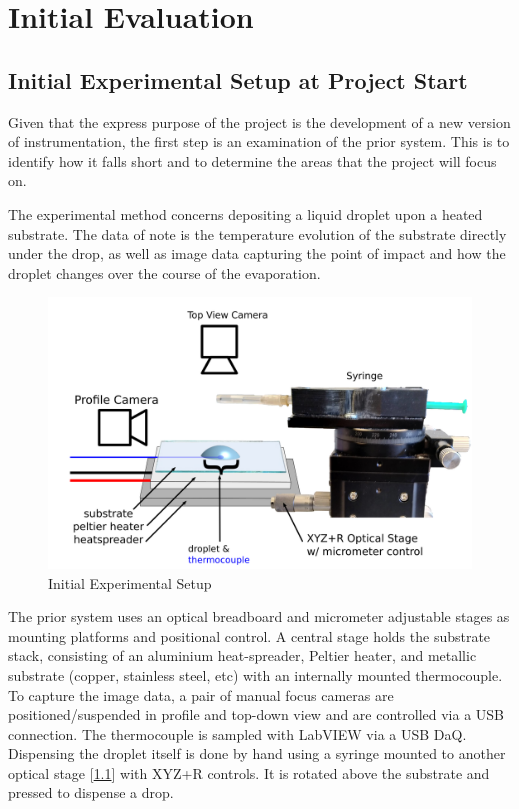 \chapter{Initial Evaluation}\label{C:init_eval}

\section{Initial Experimental Setup at Project Start}
Given that the express purpose of the project is the development of a new version of instrumentation, the first step is an examination of the prior system. This is to identify how it falls short and to determine the areas that the project will focus on.

The experimental method concerns depositing a liquid droplet upon a heated substrate. The data of note is the temperature evolution of the substrate directly under the drop, as well as image data capturing the point of impact and how the droplet changes over the course of the evaporation.

\vspace*{-16pt}
\begin{figure}[h]
    \begin{center}
        \includegraphics[width=.6\textwidth]{img/init_syr.png}
        \caption{Initial Experimental Setup}
        \label{fig:prior_exp}
    \end{center}
\end{figure}
\vspace*{-16pt}

The prior system uses an optical breadboard and micrometer adjustable stages as mounting platforms and positional control.
A central stage holds the substrate stack, consisting of an aluminium heat-spreader, Peltier heater, and metallic substrate (copper, stainless steel, etc) with an internally mounted thermocouple.
To capture the image data, a pair of manual focus cameras are positioned/suspended in profile and top-down view and are controlled via a USB connection. The thermocouple is sampled with LabVIEW via a USB DaQ.
Dispensing the droplet itself is done by hand using a syringe mounted to another optical stage [\ref{fig:prior_exp}] with XYZ+R controls. It is rotated above the substrate and pressed to dispense a drop.

